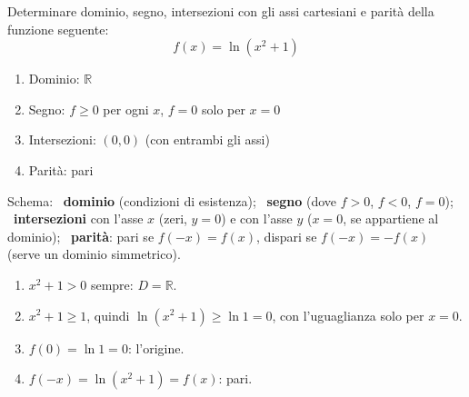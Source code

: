 \begin{question}[ID=1.11, subtitle={Studio di una funzione logaritmica pari}, difficulty=media, tags={funzioni, studio di funzione, logaritmi, parità}]
Determinare dominio, segno, intersezioni con gli assi cartesiani e parità della funzione seguente:
\begin{equation*}
    f(x)=\ln(x^2+1)
\end{equation*}
\begin{solution}
\begin{enumerate}
    \item Dominio: $\mathbb{R}$
    \item Segno: $f\geq0$ per ogni $x$, $f=0$ solo per $x=0$
    \item Intersezioni: $(0,0)$ (con entrambi gli assi)
    \item Parità: pari
\end{enumerate}
\end{solution}
\begin{explanation}
Schema: \ \textbf{dominio} (condizioni di esistenza); \ \textbf{segno} (dove $f>0$, $f<0$, $f=0$); \ \textbf{intersezioni} con l'asse $x$ (zeri, $y=0$) e con l'asse $y$ ($x=0$, se appartiene al dominio); \ \textbf{parità}: pari se $f(-x)=f(x)$, dispari se $f(-x)=-f(x)$ (serve un dominio simmetrico).
\begin{enumerate}
    \item $x^2+1>0$ sempre: $D=\mathbb{R}$.
    \item $x^2+1\geq1$, quindi $\ln(x^2+1)\geq\ln1=0$, con l'uguaglianza solo per $x=0$.
    \item $f(0)=\ln1=0$: l'origine.
    \item $f(-x)=\ln(x^2+1)=f(x)$: pari.
\end{enumerate}
\end{explanation}
\end{question}


